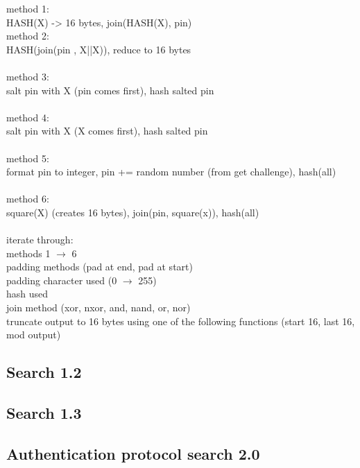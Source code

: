 \documentclass[bsc,frontabs,twoside,singlespacing,parskip,deptreport]{infthesis}     %
\begin{document}
method 1:\\
HASH(X) -> 16 bytes, join(HASH(X), pin)\\

method 2:\\
HASH(join(pin , X||X)), reduce to 16 bytes\\\\

method 3:\\
salt pin with X (pin comes first), hash salted pin\\\\

method 4:\\
salt pin with X (X comes first), hash salted pin\\\\

method 5:\\
format pin to integer, pin += random number (from get challenge), hash(all)\\\\

method 6:\\
square(X) (creates 16 bytes), join(pin, square(x)), hash(all)\\\\

iterate through:\\
methods 1 $\rightarrow$ 6\\
padding methods (pad at end, pad at start)\\
padding character used (0 $\rightarrow$ 255)\\
hash used\\
join method (xor, nxor, and, nand, or, nor)\\
truncate output to 16 bytes using one of the following functions (start 16, last 16, mod output)\\



\subsection{Search 1.2}
\subsection{Search 1.3}


\subsection{Authentication protocol search 2.0}
\end{document}
